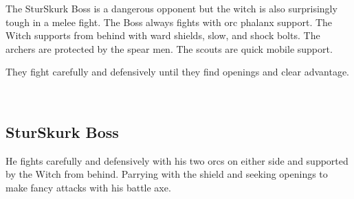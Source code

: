 The SturSkurk Boss is a dangerous opponent but the witch is also surprisingly tough in a melee fight. The Boss always fights with orc phalanx support. The Witch supports from behind with ward shields, slow, and shock bolts. The archers are protected by the spear men. The scouts are quick mobile support.

They fight carefully and defensively until they find openings and clear advantage.

\


\subsection*{SturSkurk Boss}
\label{sturskurkboss}

He fights carefully and defensively with his two orcs on either side and supported by the Witch from behind. Parrying with the shield and seeking openings to make fancy attacks with his battle axe.

\

